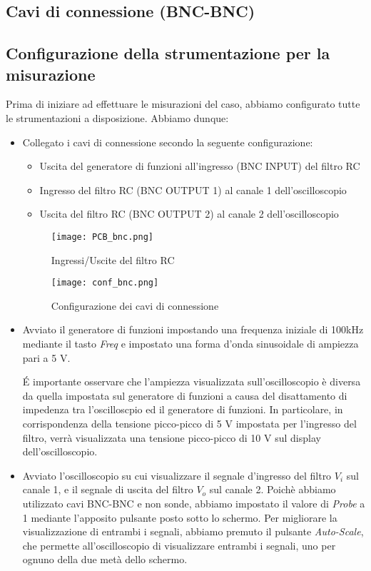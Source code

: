 \subsection*{Cavi di connessione (BNC-BNC)}
\clearpage

\subsection{Configurazione della strumentazione per la misurazione}

Prima di iniziare ad effettuare le misurazioni del caso, abbiamo configurato tutte le strumentazioni a disposizione. Abbiamo dunque:

\begin{itemize}
    \item Collegato i cavi di connessione secondo la seguente configurazione:
    \begin{itemize}
        \item Uscita del generatore di funzioni all'ingresso (BNC INPUT) del filtro RC
        \item Ingresso del filtro RC (BNC OUTPUT 1) al canale 1 dell'oscilloscopio
        \item Uscita del filtro RC (BNC OUTPUT 2) al canale 2 dell'oscilloscopio
    \end{itemize}
    \begin{figure}[h]
        \centering
        \texttt{[image: PCB\_bnc.png]}
        \caption{Ingressi/Uscite del filtro RC}
        \label{fig:pcb_bnc}
    \end{figure}
    \begin{figure}[h]
        \centering
        \texttt{[image: conf\_bnc.png]}
        \caption{Configurazione dei cavi di connessione}
        \label{fig:conf_bnc}
    \end{figure}
    \FloatBarrier

    \item Avviato il generatore di funzioni impostando una frequenza iniziale di 100kHz mediante il tasto \emph{Freq} e impostato una forma d'onda sinusoidale di ampiezza pari a 5 V.
    
    \'E importante osservare che l'ampiezza visualizzata sull'oscilloscopio è diversa da quella impostata sul generatore di funzioni a causa del disattamento di impedenza tra l'oscilloscpio ed il generatore di funzioni. In particolare, in corrispondenza della tensione picco-picco di 5 V impostata per l'ingresso del filtro, verrà visualizzata una tensione picco-picco di 10 V sul display dell'oscilloscopio.
    \item Avviato l'oscilloscopio su cui visualizzare il segnale d'ingresso del filtro $V_i$ sul canale 1, e il segnale di uscita del filtro $V_o$ sul canale 2.
    Poichè abbiamo utilizzato cavi BNC-BNC e non sonde, abbiamo impostato il valore di \emph{Probe} a 1 mediante l'apposito pulsante posto sotto lo schermo.
    Per migliorare la visualizzazione di entrambi i segnali, abbiamo premuto il pulsante \emph{Auto-Scale}, che permette all'oscilloscopio di visualizzare entrambi i segnali, uno per ognuno della due metà dello schermo.
    

\end{itemize}
